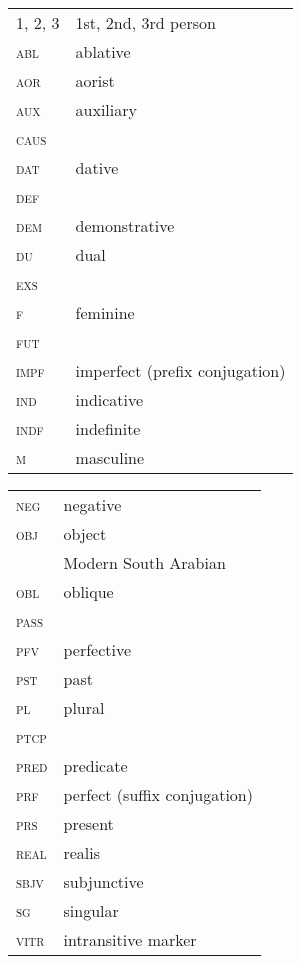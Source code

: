 \documentclass[output=paper]{langsci/langscibook}
\begin{document}
\begin{tabularx}{.5\textwidth}{@{}lQ@{}}
\textsc{1, 2, 3} & 1st, 2nd, 3rd person \\
\textsc{abl} & ablative \\
\textsc{aor} & aorist \\
\textsc{aux} & auxiliary \\
\textsc{caus} &  \\
\textsc{dat} & dative \\
\textsc{def} &   \\
\textsc{dem} & demonstrative \\
\textsc{du} & dual \\
\textsc{exs} &  \\
\textsc{f} & feminine \\
\textsc{fut} &  \\
\textsc{impf} & imperfect (prefix conjugation) \\
\textsc{ind} & indicative \\
\textsc{indf} & indefinite \\
\textsc{m} & masculine \\
\end{tabularx}%
\begin{tabularx}{.5\textwidth}{@{}lQ@{}}
\textsc{neg} & negative \\
\textsc{obj} & object \\
 & Modern {South Arabian} \\
\textsc{obl} & oblique \\
\textsc{pass} &  \\
\textsc{pfv} & perfective \\
\textsc{pst} & past \\
\textsc{pl} & plural \\
\textsc{ptcp} &  \\
\textsc{pred} & predicate \\
\textsc{prf} & perfect (suffix conjugation) \\
\textsc{prs} & present \\
\textsc{real} & realis \\
\textsc{sbjv} & subjunctive \\
\textsc{sg} & singular \\
\textsc{vitr} & intransitive marker \\
\end{tabularx}%



\sloppy
\printbibliography[heading=subbibliography,notkeyword=this]
\end{document}
